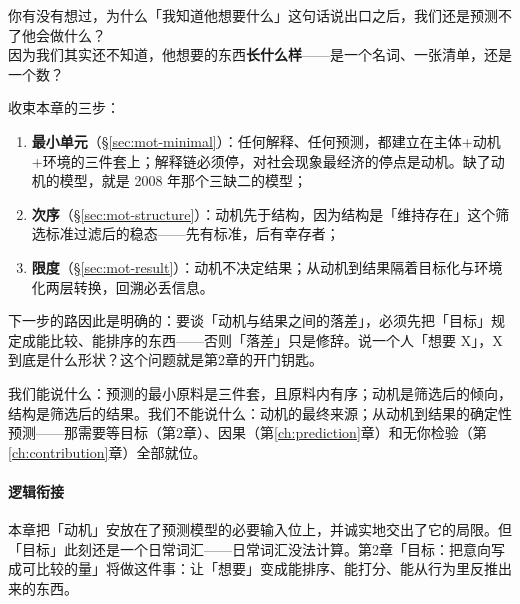 \documentclass[../../main2.tex]{subfiles}
\begin{document}
	\begin{readingnote}
		你有没有想过，为什么「我知道他想要什么」这句话说出口之后，我们还是预测不了他会做什么？\\
		因为我们其实还不知道，他想要的东西\textbf{长什么样}——是一个名词、一张清单，还是一个数？
	\end{readingnote}

	收束本章的三步：
	\begin{enumerate}
		\item \textbf{最小单元}（§\ref{sec:mot-minimal}）：任何解释、任何预测，都建立在主体+动机+环境的三件套上；解释链必须停，对社会现象最经济的停点是动机。缺了动机的模型，就是 2008 年那个三缺二的模型；
		\item \textbf{次序}（§\ref{sec:mot-structure}）：动机先于结构，因为结构是「维持存在」这个筛选标准过滤后的稳态——先有标准，后有幸存者；
		\item \textbf{限度}（§\ref{sec:mot-result}）：动机不决定结果；从动机到结果隔着目标化与环境化两层转换，回溯必丢信息。
	\end{enumerate}

	下一步的路因此是明确的：要谈「动机与结果之间的落差」，必须先把「目标」规定成能比较、能排序的东西——否则「落差」只是修辞。说一个人「想要 X」，X 到底是什么形状？这个问题就是第2章的开门钥匙。

	我们能说什么：预测的最小原料是三件套，且原料内有序；动机是筛选后的倾向，结构是筛选后的结果。我们不能说什么：动机的最终来源；从动机到结果的确定性预测——那需要等目标（第2章）、因果（第\ref{ch:prediction}章）和无你检验（第\ref{ch:contribution}章）全部就位。

	\paragraph*{逻辑衔接}
	本章把「动机」安放在了预测模型的必要输入位上，并诚实地交出了它的局限。但「目标」此刻还是一个日常词汇——日常词汇没法计算。第2章「目标：把意向写成可比较的量」将做这件事：让「想要」变成能排序、能打分、能从行为里反推出来的东西。
\end{document}
